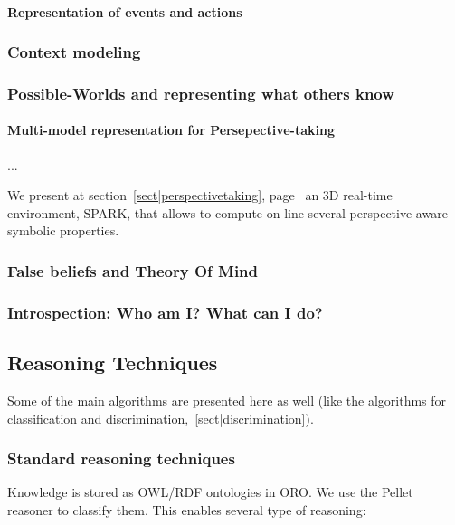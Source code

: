 \paragraph{Representation of events and actions}

\subsubsection{Context modeling}
\subsubsection{Possible-Worlds and representing what others know}

\paragraph{Multi-model representation for Persepective-taking}
\label{sect|alterite}

...

We present at section~\ref{sect|perspectivetaking}, page~\pageref{sect|perspectivetaking} an 3D real-time environment, SPARK, that allows to compute on-line several perspective aware symbolic properties.

\subsubsection{False beliefs and Theory Of Mind}
\label{sect|theory-of-mind}



\subsubsection{Introspection: Who am I? What can I do?}

\subsection{Reasoning Techniques}

Some of the main algorithms are presented here as well (like the algorithms for
classification and discrimination,~\ref{sect|discrimination}).


\subsubsection{Standard reasoning techniques}


Knowledge is stored as OWL/RDF ontologies in ORO. We use the Pellet reasoner to
classify them. This enables several type of reasoning:

